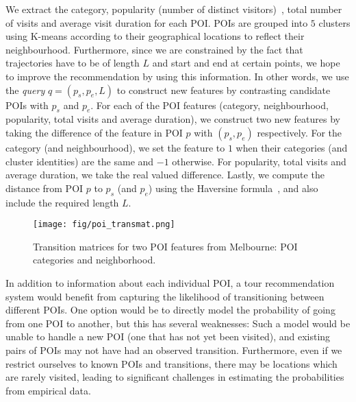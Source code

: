 We extract the category, popularity (number of distinct visitors)~\cite{ht10}, total number of visits and average visit duration for each POI.
POIs are grouped into $5$ clusters using K-means according to their geographical locations to reflect their neighbourhood.
Furthermore, since we are constrained by the fact that trajectories have to be of length $L$ and start and end at certain points, we hope to improve the recommendation by using this information.
In other words, we use the \textit{query} $q = (p_s, p_e, L)$ to construct new features by contrasting candidate POIs with $p_s$ and $p_e$.
%
For each of the POI features (category, neighbourhood, popularity, total visits and average duration),
we construct two new features by taking the difference of the feature in POI $p$ with $(p_s, p_e)$ respectively.
For the category (and neighbourhood), we set the feature to $1$ when their categories (and cluster identities) are the same and $-1$ otherwise.
For popularity, total visits and average duration, we take the real valued difference.
Lastly, we compute the distance from POI $p$ to $p_s$ (and $p_e$) using the Haversine formula~\cite{haversine},
and also include the required length $L$.




\begin{figure}[t]
\texttt{[image: fig/poi\_transmat.png]}
\caption{Transition matrices for two POI features from Melbourne: POI categories and neighborhood.
}
\label{fig:transmat}\captionmoveup
\end{figure}


In addition to information about each individual POI, a tour recommendation system would benefit
from capturing the likelihood of transitioning between different POIs. One option would be to
directly model the probability of going from one POI to another, but this has several weaknesses:
Such a model would be unable to handle a new POI (one that has not yet been visited),
and existing pairs of POIs may not have had an observed transition.
Furthermore, even if we restrict ourselves to known POIs and transitions,
there may be locations which are rarely visited,
leading to significant challenges in estimating the probabilities from empirical data.

